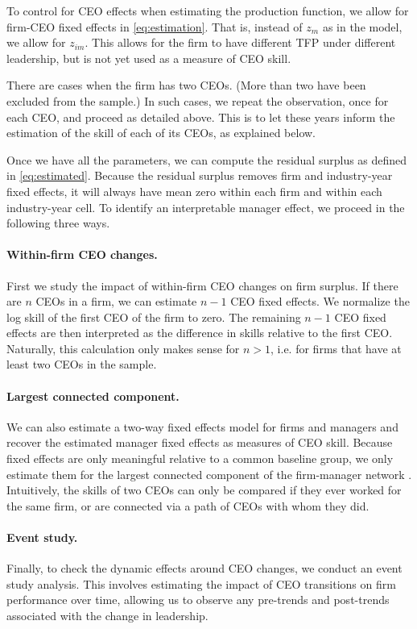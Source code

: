 \documentclass[11pt,a4paper]{article}
\begin{document}
To control for CEO effects when estimating the production function, we allow for firm-CEO fixed effects in \eqref{eq:estimation}. That is, instead of $z_m$ as in the model, we allow for $z_{im}$. This allows for the firm to have different TFP under different leadership, but is not yet used as a measure of CEO skill. 

There are cases when the firm has two CEOs. (More than two have been excluded from the sample.) In such cases, we repeat the observation, once for each CEO, and proceed as detailed above. This is to let these years inform the estimation of the skill of each of its CEOs, as explained below.

Once we have all the parameters, we can compute the residual surplus as defined in \eqref{eq:estimated}. Because the residual surplus removes firm and industry-year fixed effects, it will always have mean zero within each firm and within each industry-year cell. To identify an interpretable manager effect, we proceed in the following three ways.

\paragraph{Within-firm CEO changes.}
First we study the impact of within-firm CEO changes on firm surplus. If there are $n$ CEOs in a firm, we can estimate $n-1$ CEO fixed effects. We normalize the log skill of the first CEO of the firm to zero. The remaining $n-1$ CEO fixed effects are then interpreted as the difference in skills relative to the first CEO. Naturally, this calculation only makes sense for $n>1$, i.e. for firms that have at least two CEOs in the sample.

\paragraph{Largest connected component.}
We can also estimate a two-way fixed effects model for firms and managers \citep{Abowd1999Econometrica,Card2018JoLE,reghdfe} and recover the estimated manager fixed effects as measures of CEO skill. Because fixed effects are only meaningful relative to a common baseline group, we only estimate them for the largest connected component of the firm-manager network \citep{Bonhomme2023-dx}. Intuitively, the skills of two CEOs can only be compared if they ever worked for the same firm, or are connected via a path of CEOs with whom they did.

\paragraph{Event study.}
Finally, to check the dynamic effects around CEO changes, we conduct an event study analysis. This involves estimating the impact of CEO transitions on firm performance over time, allowing us to observe any pre-trends and post-trends associated with the change in leadership. 
\end{document}
